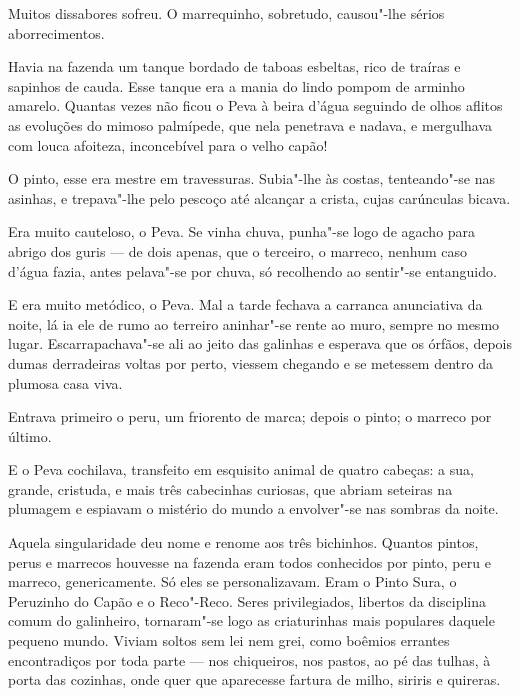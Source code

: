 Muitos dissabores sofreu. O marrequinho, sobretudo, causou"-lhe sérios
aborrecimentos.

Havia na fazenda um tanque bordado de taboas esbeltas, rico de traíras e
sapinhos de cauda. Esse tanque era a mania do lindo pompom de arminho
amarelo. Quantas vezes não ficou o Peva à beira d'água seguindo de olhos
aflitos as evoluções do mimoso palmípede, que nela penetrava e nadava, e
mergulhava com louca afoiteza, inconcebível para o velho capão!


O pinto, esse era mestre em travessuras. Subia"-lhe às costas,
tenteando"-se nas asinhas, e trepava"-lhe pelo pescoço até alcançar a
crista, cujas carúnculas bicava.

Era muito cauteloso, o Peva. Se vinha chuva, punha"-se logo de agacho
para abrigo dos guris --- de dois apenas, que o terceiro, o marreco,
nenhum caso d'água fazia, antes pelava"-se por chuva, só recolhendo ao
sentir"-se entanguido.

E era muito metódico, o Peva. Mal a tarde fechava a carranca anunciativa
da noite, lá ia ele de rumo ao terreiro aninhar"-se rente ao muro, sempre
no mesmo lugar. Escarrapachava"-se ali ao jeito das galinhas e esperava
que os órfãos, depois dumas derradeiras voltas por perto, viessem
chegando e se metessem dentro da plumosa casa viva.

Entrava primeiro o peru, um friorento de marca; depois o pinto; o
marreco por último.

E o Peva cochilava, transfeito em esquisito animal de quatro cabeças: a
sua, grande, cristuda, e mais três cabecinhas curiosas, que abriam
seteiras na plumagem e espiavam o mistério do mundo a envolver"-se nas
sombras da noite.

Aquela singularidade deu nome e renome aos três bichinhos. Quantos
pintos, perus e marrecos houvesse na fazenda eram todos conhecidos por
pinto, peru e marreco, genericamente. Só eles se personalizavam. Eram o
Pinto Sura, o Peruzinho do Capão e o Reco"-Reco. Seres privilegiados,
libertos da disciplina comum do galinheiro, tornaram"-se logo as
criaturinhas mais populares daquele pequeno mundo. Viviam soltos sem lei
nem grei, como boêmios errantes encontradiços por toda parte --- nos
chiqueiros, nos pastos, ao pé das tulhas, à porta das cozinhas, onde
quer que aparecesse fartura de milho, siriris e quireras.

